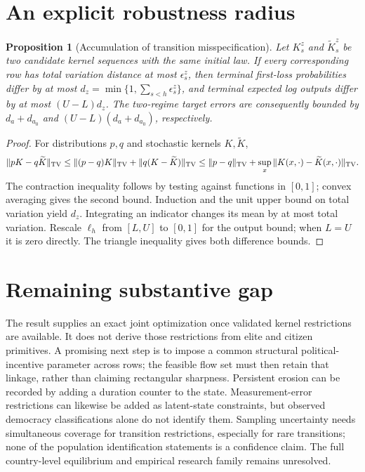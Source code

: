 \documentclass[11pt]{article}
\newtheorem{proposition}[theorem]{Proposition}
\begin{document}
\section{An explicit robustness radius}
\begin{proposition}[Accumulation of transition misspecification]
Let $K_s^z$ and $\widetilde K_s^z$ be two candidate kernel sequences with
the same initial law. If every corresponding row has total variation
distance at most $\epsilon_s^z$, then terminal first-loss probabilities
differ by at most $d_z=\min\{1,\sum_{s<h}\epsilon_s^z\}$, and terminal
expected log outputs differ by at most $(U-L)d_z$. The two-regime target
errors are consequently bounded by $d_a+d_{a_0}$ and
$(U-L)(d_a+d_{a_0})$, respectively.
\end{proposition}
\begin{proof}
For distributions $p,q$ and stochastic kernels $K,\widetilde K$,
\[
 \|pK-q\widetilde K\|_{\rm TV}
 \leq\|(p-q)K\|_{\rm TV}+\|q(K-\widetilde K)\|_{\rm TV}
 \leq\|p-q\|_{\rm TV}+\sup_x\|K(x,\cdot)-\widetilde K(x,\cdot)\|_{\rm TV}.
\]
The contraction inequality follows by testing against functions in
$[0,1]$; convex averaging gives the second bound. Induction and the unit
upper bound on total variation yield $d_z$. Integrating an indicator
changes its mean by at most total variation. Rescale $\ell_h$ from
$[L,U]$ to $[0,1]$ for the output bound; when $L=U$ it is zero directly.
The triangle inequality gives both difference bounds.
\end{proof}

\section{Remaining substantive gap}
The result supplies an exact joint optimization once validated kernel
restrictions are available. It does not derive those restrictions from
elite and citizen primitives. A promising next step is to impose a common
structural political-incentive parameter across rows; the feasible flow
set must then retain that linkage, rather than claiming rectangular
sharpness. Persistent erosion can be recorded by adding a duration
counter to the state. Measurement-error restrictions can likewise be
added as latent-state constraints, but observed democracy classifications
alone do not identify them. Sampling uncertainty needs simultaneous
coverage for transition restrictions, especially for rare transitions;
none of the population identification statements is a confidence claim.
The full country-level equilibrium and empirical research family remains
unresolved.
\end{document}
